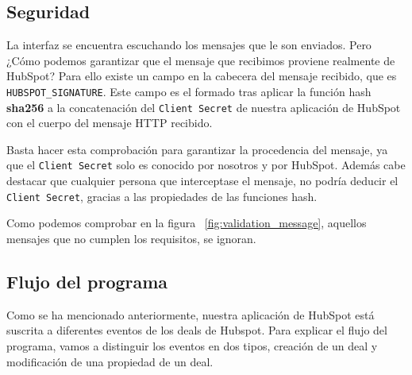 \subsection{Seguridad}


La interfaz se encuentra escuchando los mensajes que le son enviados. Pero ¿Cómo podemos garantizar que el mensaje que recibimos proviene realmente de HubSpot?
Para ello existe un campo en la cabecera del mensaje recibido, que es \verb|HUBSPOT_SIGNATURE|. 
Este campo es el formado tras aplicar la función hash \textbf{sha256} a la concatenación del \verb|Client Secret| de nuestra aplicación de HubSpot con el cuerpo del mensaje HTTP recibido.

Basta hacer esta comprobación para garantizar la procedencia del mensaje, ya que el \verb|Client Secret| solo es conocido por nosotros y por HubSpot. 
Además cabe destacar que cualquier persona que interceptase el mensaje, no podría deducir el \verb|Client Secret|, gracias a las propiedades de las funciones hash. %


Como podemos comprobar en la figura ~\ref{fig:validation_message}, aquellos mensajes que no cumplen los requisitos, se ignoran.




\subsection{Flujo del programa}

Como se ha mencionado anteriormente, nuestra aplicación de HubSpot está suscrita a diferentes eventos de los deals de Hubspot.
Para explicar el flujo del programa, vamos a distinguir los eventos en dos tipos, creación de un deal y modificación de una propiedad de un deal.

